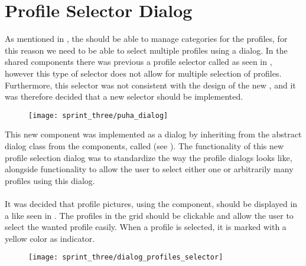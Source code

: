 
\section{Profile Selector Dialog}
\label{sec:profile_selector_dialog}

As mentioned in , the \ct should be able to manage categories for the profiles, for this reason we need to be able to select multiple profiles using a dialog. In the shared components there was previous a profile selector called  as seen in , however this type of selector does not allow for multiple selection of profiles. Furthermore, this selector was not consistent with the design of the new \gc, and it was therefore decided that a new selector should be implemented.

\begin{figure}[!htbp]
        \centering
        \texttt{[image: sprint\_three/puha\_dialog]}
        \caption{}
        \label{fig:puha_dialog}
\end{figure}

\FloatBarrier

This new component was implemented as a dialog by inheriting from the abstract dialog class from the components, called  (see ). The functionality of this new profile selection dialog was to standardize the way the profile dialogs looks like, alongside functionality to allow the user to select either one or arbitrarily many profiles using this dialog.
\\\\
It was decided that profile pictures, using the  component, should be displayed in a  like seen in . The profiles in the grid should be clickable and allow the user to select the wanted profile easily. When a profile is selected, it is marked with a yellow color as indicator.

\begin{figure}[!htbp]
        \centering
        \texttt{[image: sprint\_three/dialog\_profiles\_selector]}
        \caption{}
        \label{fig:dialog_profiles_selector}
\end{figure}

